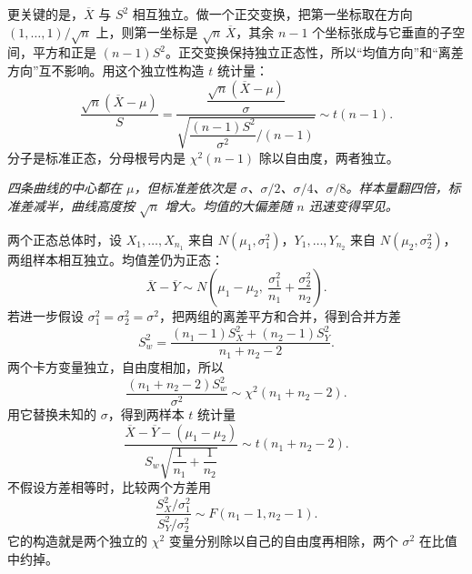 更关键的是，$\overline{X}$ 与 $S^2$ 相互独立。做一个正交变换，把第一坐标取在方向 $(1,\dots,1)/\sqrt{n}$ 上，则第一坐标是 $\sqrt{n}\,\overline{X}$，其余 $n-1$ 个坐标张成与它垂直的子空间，平方和正是 $(n-1)S^2$。正交变换保持独立正态性，所以“均值方向”和“离差方向”互不影响。用这个独立性构造 $t$ 统计量：
\[
    \frac{\sqrt{n}(\overline{X}-\mu)}{S}
    =\frac{\dfrac{\sqrt{n}(\overline{X}-\mu)}{\sigma}}
    {\sqrt{\dfrac{(n-1)S^2}{\sigma^2}\Big/(n-1)}}
    \sim t(n-1).
\]
分子是标准正态，分母根号内是 $\chi^2(n-1)$ 除以自由度，两者独立。

\begin{center}
\begin{minipage}{\linewidth}
\centering
{}
\par\vspace{2pt}
{\footnotesize\itshape 四条曲线的中心都在 $\mu$，但标准差依次是 $\sigma$、$\sigma/2$、$\sigma/4$、$\sigma/8$。样本量翻四倍，标准差减半，曲线高度按 $\sqrt{n}$ 增大。均值的大偏差随 $n$ 迅速变得罕见。}
\end{minipage}
\end{center}

两个正态总体时，设 $X_1,\dots,X_{n_1}$ 来自 $N(\mu_1,\sigma_1^2)$，$Y_1,\dots,Y_{n_2}$ 来自 $N(\mu_2,\sigma_2^2)$，两组样本相互独立。均值差仍为正态：
\[
    \overline{X}-\overline{Y}
    \sim N\!\left(\mu_1-\mu_2,\ \frac{\sigma_1^2}{n_1}+\frac{\sigma_2^2}{n_2}\right).
\]
若进一步假设 $\sigma_1^2=\sigma_2^2=\sigma^2$，把两组的离差平方和合并，得到合并方差
\[
    S_w^2=\frac{(n_1-1)S_X^2+(n_2-1)S_Y^2}{n_1+n_2-2}.
\]
两个卡方变量独立，自由度相加，所以
\[
    \frac{(n_1+n_2-2)S_w^2}{\sigma^2}\sim\chi^2(n_1+n_2-2).
\]
用它替换未知的 $\sigma$，得到两样本 $t$ 统计量
\[
    \frac{\overline{X}-\overline{Y}-(\mu_1-\mu_2)}
    {S_w\sqrt{\dfrac{1}{n_1}+\dfrac{1}{n_2}}}
    \sim t(n_1+n_2-2).
\]
不假设方差相等时，比较两个方差用
\[
    \frac{S_X^2/\sigma_1^2}{S_Y^2/\sigma_2^2}
    \sim F(n_1-1,n_2-1).
\]
它的构造就是两个独立的 $\chi^2$ 变量分别除以自己的自由度再相除，两个 $\sigma^2$ 在比值中约掉。

